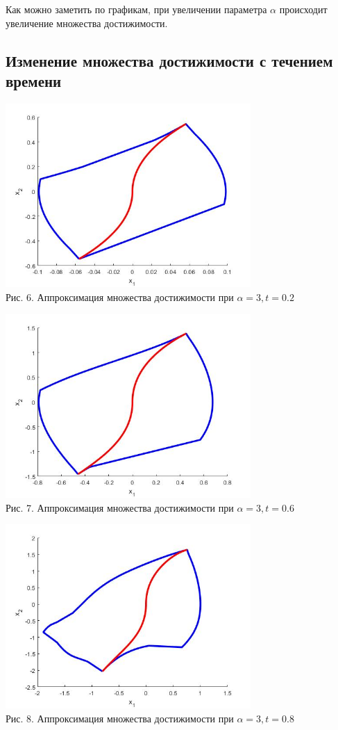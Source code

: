 \documentclass{article}
\theoremstyle{definition}
\begin{document}
	{Как можно заметить по графикам, при увеличении параметра $\alpha$ происходит увеличение множества достижимости.}
	\newpage
	{\subsection{Изменение множества достижимости с течением времени}}
	\begin{center}
		\includegraphics[width=0.7\textwidth]{texample1.jpg}\\
		{Рис. 6. Аппроксимация множества достижимости при $\alpha = 3, t = 0.2$ }
	\end{center}
	\begin{center}
		\includegraphics[width=0.7\textwidth]{texample2.jpg}\\
		{Рис. 7. Аппроксимация множества достижимости при $\alpha = 3, t = 0.6$ }
	\end{center}
	\begin{center}
		\includegraphics[width=0.7\textwidth]{texample3.jpg}\\
		{Рис. 8. Аппроксимация множества достижимости при $\alpha = 3, t = 0.8$ }
	\end{center}
	\newpage
\end{document}

